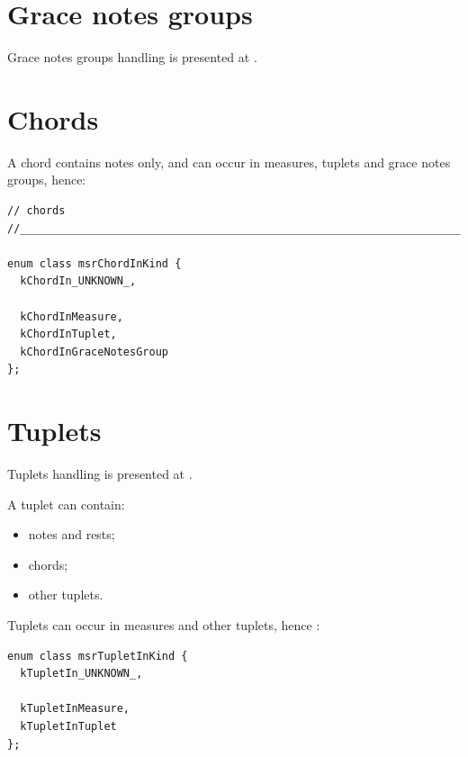 \section{Grace notes groups}\label{Grace notes groups}

Grace notes groups handling is presented at .


\section{Chords}\label{Chords}

A chord contains notes only, and can occur in measures, tuplets and grace notes groups, hence:
\begin{lstlisting}[language=CPlusPlus]
// chords
//______________________________________________________________________________

enum class msrChordInKind {
  kChordIn_UNKNOWN_,

  kChordInMeasure,
  kChordInTuplet,
  kChordInGraceNotesGroup
};
\end{lstlisting}


\section{Tuplets}\label{Tuplets}

Tuplets handling is presented at .

A tuplet can contain:
\begin{itemize}
\item notes and rests;
\item chords;
\item other tuplets.
\end{itemize}

Tuplets can occur in measures and other tuplets, hence :
\begin{lstlisting}[language=CPlusPlus]
enum class msrTupletInKind {
  kTupletIn_UNKNOWN_,

  kTupletInMeasure,
  kTupletInTuplet
};
\end{lstlisting}

